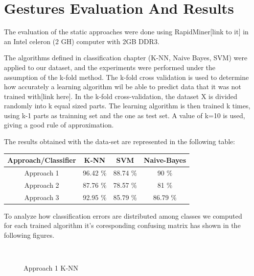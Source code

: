 \chapter{Gestures Evaluation And Results}
The evaluation of the static approaches were done using RapidMiner[link to it] in an Intel celeron (2 GH) computer with 2GB DDR3.\bigskip

The algorithms defined in classification chapter (K-NN, Naive Bayes, SVM) were applied to our dataset, and the experiments were performed under the assumption of the k-fold method. The k-fold cross validation is used to determine how accurately a learning algorithm wil be able to predict data that it was not trained with[link here]. In the k-fold cross-validation, the dataset X is divided randomly into k equal sized parts. The learning algorithm is then trained k times, using k-1 parts as trainning set and the one as test set. A value of k=10 is used, giving a good rule of approximation.
\bigskip

The results obtained with the data-set are represented in the following table:\bigskip

\begin{center}
\begin{tabular}{ |c|c|c|c| }
 \hline
 Approach/Classifier & K-NN & SVM & Naive-Bayes \\
 \hline
 Approach 1 & 96.42 \%  & 88.74 \%  & 90 \%  \\
 \hline
 Approach 2 & 87.76 \%  & 78.57 \%  & 81 \%  \\
 \hline
 Approach 3 & 92.95 \%  & 85.79 \%  & 86.79 \% \\
 \hline
\end{tabular}
\end{center}
\bigskip

To analyze how classification errors are distributed among classes we computed for each trained algorithm it's coresponding confusing matrix has shown in the following figures.\bigskip

\begin{figure}[h]
\begin{dBox}
\centering
 \mbox{
  }
  \caption{Approach 1 K-NN\label{fig:apr1_knn} }   
\end{dBox}   
\end{figure}

